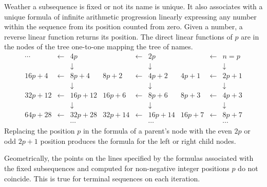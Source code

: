\documentclass{article}
\begin{document}
Weather a subsequence is fixed or not its name is unique. It also associates with a unique formula of infinite arithmetic progression linearly expressing any number within the sequence from its position counted from zero. Given a number, a reverse linear function returns its position. The direct linear functions of $p$ are in the nodes of the tree one-to-one mapping the tree of names.
\begin{displaymath}
\begin{array}{rrrrrrrrr}
\cdots&\gets&4p&&\gets&2p&&\gets&n = p\\
&&\downarrow&&&\downarrow&&&\downarrow\\
16p+4&\gets&8p+4&8p+2&\gets&4p+2&4p+1&\gets&2p+1\\
&&\downarrow&&&\downarrow&&&\downarrow\\
32p+12&\gets&16p+12&16p+6&\gets&8p+6&8p+3&\gets&4p+3\\
&&\downarrow&&&\downarrow&&&\downarrow\\
64p+28&\gets&32p+28&32p+14&\gets&16p+14&16p+7&\gets&8p+7\\
&&\cdots&&&\cdots&&&\cdots
\end{array}
\end{displaymath}
Replacing the position $p$ in the formula of a parent's node with the even $2p$ or odd $2p+1$ position produces the formula for the left or right child nodes.

Geometrically, the points on the lines specified by the formulas associated with the fixed subsequences and computed for non-negative integer positions $p$ do not coincide. This is true for terminal sequences on each iteration.
\end{document}
